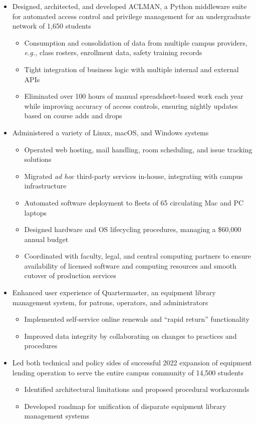 \documentclass[11pt]{article}
\begin{document}
\begin{itemize}
	\item Designed, architected, and developed ACLMAN,
		a Python middleware suite for automated
		access control and privilege management
		for an undergraduate network of 1,650 students
		\begin{itemize}
			\item Consumption and consolidation of data from multiple campus providers, \emph{e.g.,}
				class rosters, enrollment data,
				safety training records
			\item Tight integration of business logic with
				multiple internal and external APIs
			\item Eliminated over 100 hours of manual spreadsheet-based work each year
				while improving accuracy of access controls,
				ensuring nightly updates based on course adds and drops
		\end{itemize}
	\item Administered a variety of
		Linux, macOS, and Windows systems
		\begin{itemize}
			\item Operated web hosting, mail handling,
				room scheduling, and issue tracking solutions
			\item Migrated \emph{ad hoc} third-party services in-house,
				integrating with campus infrastructure
			\item Automated software deployment to
				fleets of 65 circulating Mac and PC laptops
			\item Designed hardware and OS lifecycling procedures,
				managing a \$60,000 annual budget
			\item Coordinated with faculty, legal, and central computing partners
				to ensure availability of licensed software and computing resources
				and smooth cutover of production services
		\end{itemize}
	\item Enhanced user experience of Quartermaster,
		an equipment library management system,
		for patrons, operators, and administrators
		\begin{itemize}
			\item Implemented self-service online renewals
				and ``rapid return'' functionality
			\item Improved data integrity by collaborating on
				changes to practices and procedures
		\end{itemize}
	\item Led both technical and policy sides of
		successful 2022 expansion of equipment lending operation
		to serve the entire campus community
		of 14,500 students
		\begin{itemize}
			\item Identified architectural limitations
				and proposed procedural workarounds
			\item Developed roadmap for unification of disparate
				equipment library management systems
		\end{itemize}
\end{itemize}
\end{document}
